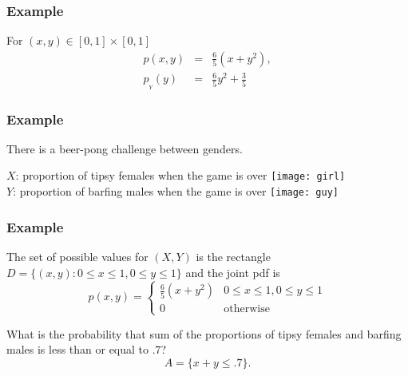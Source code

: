 \begin{frame}[fragile]\frametitle{Example}

For $(x,y) \in [0,1]\times[0,1]$
\begin{eqnarray*}
p(x,y) &= &\frac{6}{5}(x+y^2), \\ 
p_{_Y}(y) & = & \frac{6}{5} y^2 + \frac{3}{5}
\end{eqnarray*}


\end{frame}

\begin{frame}[fragile]\frametitle{Example}
There is a beer-pong challenge between genders. 


$X$: proportion of tipsy females when the game is over \texttt{[image: girl]}\\ 
$Y$: proportion of barfing males when the game is over \texttt{[image: guy]}

\end{frame}

\begin{frame}[fragile]\frametitle{Example}
The set of possible values for $(X,Y)$ is the rectangle $D=\{(x,y): 0 \le x
\le 1, 0 \le y \le 1 \}$ and the joint pdf is
\[ p(x,y) = \left \{ \begin{array}{cl} \frac{6}{5}(x+y^2) & 0 \le
x \le 1, 0 \le y \le 1 \\ 0 & \text{otherwise} \end{array} \right.
\] 

\vspace{.1in}

What is the probability that sum of the proportions of tipsy females and barfing males is less than or equal to $.7$?  
$$A = \{x+y \leq .7\}.$$

\end{frame}


